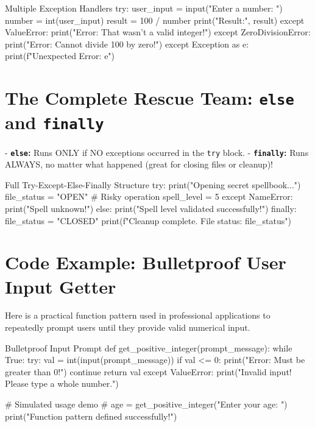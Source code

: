 \begin{pycode}{Multiple Exception Handlers}
try:
    user_input = input("Enter a number: ")
    number = int(user_input)
    result = 100 / number
    print("Result:", result)
except ValueError:
    print("Error: That wasn't a valid integer!")
except ZeroDivisionError:
    print("Error: Cannot divide 100 by zero!")
except Exception as e:
    print(f"Unexpected Error: {e}")
\end{pycode}

\section{The Complete Rescue Team: \texttt{else} and \texttt{finally}}

- \textbf{\texttt{else}:} Runs ONLY if NO exceptions occurred in the \texttt{try} block.
- \textbf{\texttt{finally}:} Runs ALWAYS, no matter what happened (great for closing files or cleanup)!

\begin{pycode}{Full Try-Except-Else-Finally Structure}
try:
    print("Opening secret spellbook...")
    file_status = "OPEN"
    # Risky operation
    spell_level = 5
except NameError:
    print("Spell unknown!")
else:
    print("Spell level validated successfully!")
finally:
    file_status = "CLOSED"
    print(f"Cleanup complete. File status: {file_status}")
\end{pycode}

\section{Code Example: Bulletproof User Input Getter}

Here is a practical function pattern used in professional applications to repeatedly prompt users until they provide valid numerical input.

\begin{pycode}{Bulletproof Input Prompt}
def get_positive_integer(prompt_message):
    while True:
        try:
            val = int(input(prompt_message))
            if val <= 0:
                print("Error: Must be greater than 0!")
                continue
            return val
        except ValueError:
            print("Invalid input! Please type a whole number.")

# Simulated usage demo
# age = get_positive_integer("Enter your age: ")
print("Function pattern defined successfully!")
\end{pycode}


